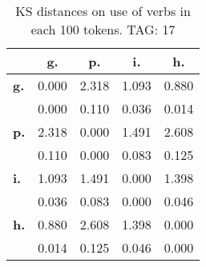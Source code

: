 \begin{table}[h!]
\begin{center}
\begin{tabular}{| l || c | c | c | c |}\hline
 & {\bf g.} & {\bf p.} & {\bf i.} & {\bf h.} \\\hline\hline
{\bf g.} & 0.000 & 2.318 & 1.093 & 0.880 \\
{\bf } & 0.000 & 0.110 & 0.036 & 0.014 \\\hline
{\bf p.} & 2.318 & 0.000 & 1.491 & 2.608 \\
{\bf } & 0.110 & 0.000 & 0.083 & 0.125 \\\hline
{\bf i.} & 1.093 & 1.491 & 0.000 & 1.398 \\
{\bf } & 0.036 & 0.083 & 0.000 & 0.046 \\\hline
{\bf h.} & 0.880 & 2.608 & 1.398 & 0.000 \\
{\bf } & 0.014 & 0.125 & 0.046 & 0.000 \\\hline
\end{tabular}
\caption{KS distances on use of verbs in each 100 tokens. TAG: 17}
\end{center}
\end{table}